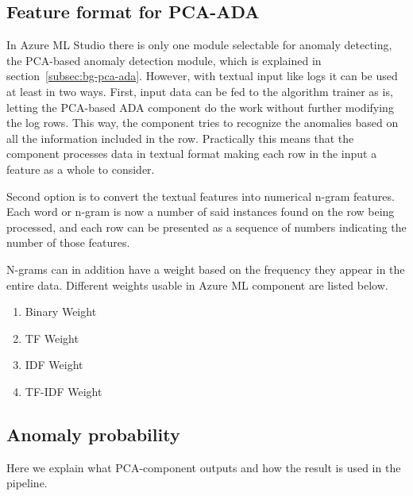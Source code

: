 \subsection{Feature format for PCA-ADA}\label{subsec:pipe-pca-ada-feature-format}
In Azure ML Studio
there is only one module selectable
for anomaly detecting,
the PCA-based anomaly detection module,
which is explained in section~\ref{subsec:bg-pca-ada}.
However,
with textual input like logs
it can be used at least in two ways.
First,
input data can be fed to
the algorithm trainer as is,
letting the PCA-based ADA component %
do the work without further modifying the log rows.
This way,
the component tries to recognize the anomalies
based on all the information included in the row.
Practically this means
that the component processes data in textual format
making each row in the input
a feature as a whole
to consider.

Second option is to
convert the textual features
into numerical n-gram features.
Each word or n-gram
is now a number of said instances found on
the row being processed,
and each row can be presented
as a sequence of numbers
indicating the number of those features.

N-grams can in addition have a weight
based on the frequency they appear
in the entire data.
Different weights usable in Azure ML component
are listed below.

\begin{enumerate}
    \item Binary Weight
    \item TF Weight
    \item IDF Weight
    \item TF-IDF Weight
\end{enumerate}


%



\subsection{Anomaly probability}\label{subsec:pipe-anomaly-probability}
\begin{itcomment}
    Here we explain what PCA-component outputs and how the result is used in the pipeline.
\end{itcomment}

